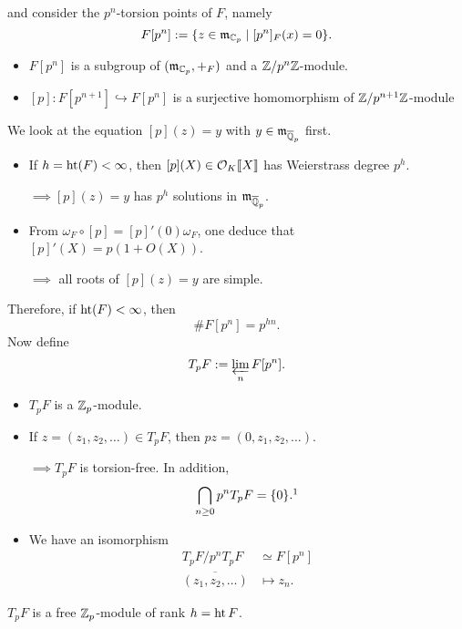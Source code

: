 and consider the $p^n$-torsion points of $F$, namely \[F[p^n] := \{z\in\mathfrak{m}_{\mathbb{C}_p}\mid [p^n]_F(x) = 0\}.\]
\begin{itemize}
    \item $F[p^n]$ is a subgroup of $(\mathfrak{m}_{\mathbb{C}_p}, +_F)$ and a $\mathbb{Z}/p^n\mathbb{Z}$-module.
    \item $[p] : F[p^{n+1}]\hookrightarrow F[p^n]$
    is a surjective homomorphism of $\mathbb{Z}/p^{n+1}\mathbb{Z}$-module
\end{itemize}
We look at the equation $[p](z) = y$ with $y\in\mathfrak{m}_{\overline{\mathbb{Q}}_p}$ first.
\begin{itemize}
    \item If $h = \operatorname{ht}(F) < \infty$,
    then $[p](X)\in \mathcal{O}_K\llbracket X \rrbracket$ has Weierstrass degree $p^h$.\par
    $\implies [p](z) = y$ has $p^h$ solutions in $\mathfrak{m}_{\overline{\mathbb{Q}}_p}$.
    \item From $\omega_F\circ [p] = [p]'(0)\omega_F$, one deduce that $[p]'(X) = p(1 + O(X))$.\par
    $\implies$ all roots of $[p](z) = y$ are simple.
\end{itemize}
Therefore, if $\operatorname{ht}(F) < \infty$, then \[\# F[p^n] = p^{hn}.\]
Now define \[T_pF := \varprojlim_n F[p^n].\]
\begin{itemize}
    \item $T_pF$ is a $\mathbb{Z}_p$-module.
    \item If $z = (z_1, z_2, \dots)\in T_pF$,
    then $pz = (0, z_1, z_2, \dots)$.\par
    $\implies T_pF$ is torsion-free. In addition,
    \[\bigcap_{n\ge 0} p^nT_pF = \{0\}.\footnotemark\]
    \item We have an isomorphism
    \begin{align*}
        T_pF/p^nT_pF &\simeq F[p^n]\\ 
        \overline{(z_1, z_2, \dots)} &\mapsto z_n.
    \end{align*}
\end{itemize}
\begin{proposition}
    $T_pF$ is a free $\mathbb{Z}_p$-module of rank $h = \operatorname{ht} F$.
\end{proposition}
